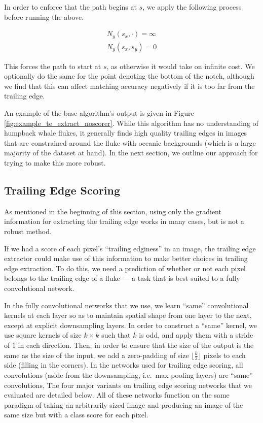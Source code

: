 In order to enforce that the path begins at $s$, we apply the following process before running the above.

\begin{align} \label{eqn:te_setup}
N_y(s_x,\cdot) = \infty \\
N_y(s_x,s_y) = 0
\end{align}

This forces the path to start at $s$, as otherwise it would take on infinite cost.
We optionally do the same for the point denoting the bottom of the notch, although we find that this can affect matching accuracy negatively if it is too far from the trailing edge.

An example of the base algorithm's output is given in Figure \ref{fig:example_te_extract_noscorer}.
While this algorithm has no understanding of humpback whale flukes, it generally finds high quality trailing edges in images that are constrained around the fluke with oceanic backgrounds (which is a large majority of the dataset at hand).
In the next section, we outline our approach for trying to make this more robust.


\subsection{Trailing Edge Scoring}

As mentioned in the beginning of this section, using only the gradient information for extracting the trailing edge works in many cases, but is not a robust method.

If we had a score of each pixel's ``trailing edginess'' in an image, the trailing edge extractor could make use of this information to make better choices in trailing edge extraction.
To do this, we need a prediction of whether or not each pixel belongs to the trailing edge of a fluke --- a task that is best suited to a fully convolutional network.

In the fully convolutional networks that we use, we learn ``same'' convolutional kernels at each layer so as to maintain spatial shape from one layer to the next, except at explicit downsampling layers.
In order to construct a ``same'' kernel, we use square kernels of size $k \times k$ such that $k$ is odd, and apply them with a stride of $1$ in each direction.
Then, in order to ensure that the size of the output is the same as the size of the input, we add a zero-padding of size $\lfloor \frac{k}{2} \rfloor$ pixels to each side (filling in the corners).
In the networks used for trailing edge scoring, all convolutions (aside from the downsampling, i.e.\ max pooling layers) are ``same'' convolutions,
The four major variants on trailing edge scoring networks that we evaluated are detailed below.
All of these networks function on the same paradigm of taking an arbitrarily sized image and producing an image of the same size but with a class score for each pixel.

